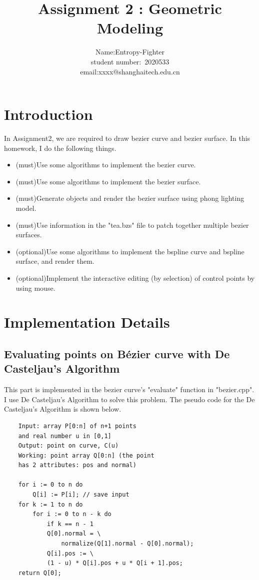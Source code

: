 \documentclass[acmtog]{acmart}
\title{Assignment 2 : Geometric Modeling}
\author{Name:\quad Entropy-Fighter\\ student number:\ 2020533
\\email:\quad xxxx@shanghaitech.edu.cn}
\begin{document}
\maketitle

\vspace*{2 ex}

\section{Introduction}
\quad In Assignment2, we are required to draw bezier curve and bezier surface.
In this homework, I do the following things.
\begin{itemize}
\item (must)Use some algorithms to implement the bezier curve.
\item (must)Use some algorithms to implement the bezier surface.
\item (must)Generate objects and render the bezier surface using phong lighting model.
\item (must)Use information in the "tea.bzs" file to patch together multiple bezier surfaces.
\item (optional)Use some algorithms to implement the bspline curve and bspline surface, and render them.
\item (optional)Implement the interactive editing (by selection) of control points by using mouse.
\end{itemize}
\section{Implementation Details}
\subsection{Evaluating points on Bézier curve with De Casteljau's Algorithm}
\quad This part is implemented in the bezier curve's "evaluate" function in "bezier.cpp". I use De Casteljau's Algorithm to 
solve this problem.
The pseudo code for the De Casteljau's Algorithm is shown below.
\begin{lstlisting}
	Input: array P[0:n] of n+1 points 
	and real number u in [0,1]	
	Output: point on curve, C(u)
	Working: point array Q[0:n] (the point
	has 2 attributes: pos and normal)
	
	for i := 0 to n do
		Q[i] := P[i]; // save input
	for k := 1 to n do
		for i := 0 to n - k do
			if k == n - 1
        	Q[0].normal = \
				normalize(Q[1].normal - Q[0].normal);
			Q[i].pos := \
			(1 - u) * Q[i].pos + u * Q[i + 1].pos;
	return Q[0];
\end{lstlisting}
\end{document}
